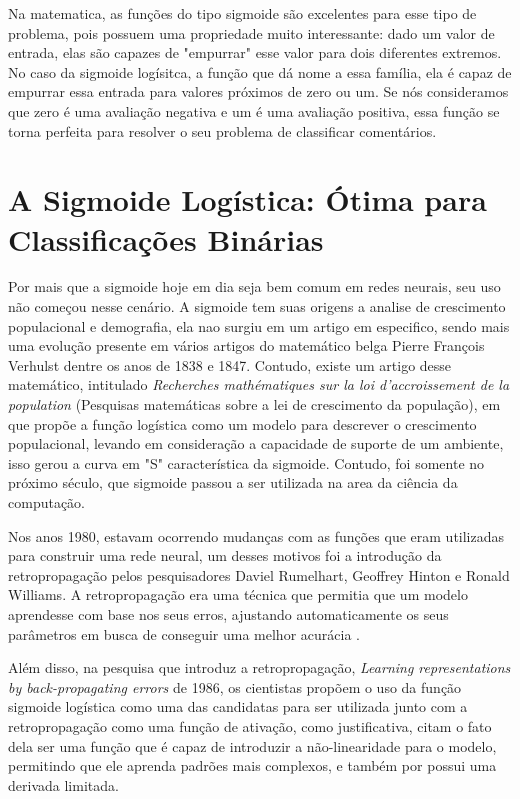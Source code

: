Na matematica, as funções do tipo sigmoide são excelentes para esse tipo de problema, pois possuem uma propriedade muito interessante: dado um valor de entrada, elas são capazes de "empurrar" esse valor para dois diferentes extremos. No caso da sigmoide logísitca, a função que dá nome a essa família, ela é capaz de empurrar essa entrada para valores próximos de zero ou um. Se nós consideramos que zero é uma avaliação negativa e um é uma avaliação positiva, essa função se torna perfeita para resolver o seu problema de classificar comentários.

\section{A Sigmoide Logística: Ótima para Classificações Binárias}

Por mais que a sigmoide hoje em dia seja bem comum em redes neurais, seu uso não começou nesse cenário. A sigmoide tem suas origens a analise de crescimento populacional e demografia, ela nao surgiu em um artigo em especifico, sendo mais uma evolução presente em vários artigos do matemático belga Pierre François Verhulst dentre os anos de 1838 e 1847. Contudo, existe um artigo desse matemático, intitulado \textit{Recherches mathématiques sur la loi d'accroissement de la population} (Pesquisas matemáticas sobre a lei de crescimento da população), em que \textcite{SigmoidVerhulst1845} propõe a função logística como um modelo para descrever o crescimento populacional, levando em consideração a capacidade de suporte de um ambiente, isso gerou a curva em "S" característica da sigmoide. Contudo, foi somente no próximo século, que sigmoide passou a ser utilizada na area da ciência da computação.

Nos anos 1980, estavam ocorrendo mudanças com as funções que eram utilizadas para construir uma rede neural, um desses motivos foi a introdução da retropropagação pelos pesquisadores Daviel Rumelhart, Geoffrey Hinton e Ronald Williams. A retropropagação era uma técnica que permitia que um modelo aprendesse com base nos seus erros, ajustando automaticamente os seus parâmetros em busca de conseguir uma melhor acurácia \parencite{BackpropagationArticle}. 

Além disso, na pesquisa que introduz a retropropagação, \textit{Learning representations by back-propagating errors} de 1986, os cientistas propõem o uso da função sigmoide logística como uma das candidatas para ser utilizada junto com a retropropagação como uma função de ativação, como justificativa, \textcite{BackpropagationArticle} citam o fato dela ser uma função que é capaz de introduzir a não-linearidade para o modelo, permitindo que ele aprenda padrões mais complexos, e também por possui uma derivada limitada.

